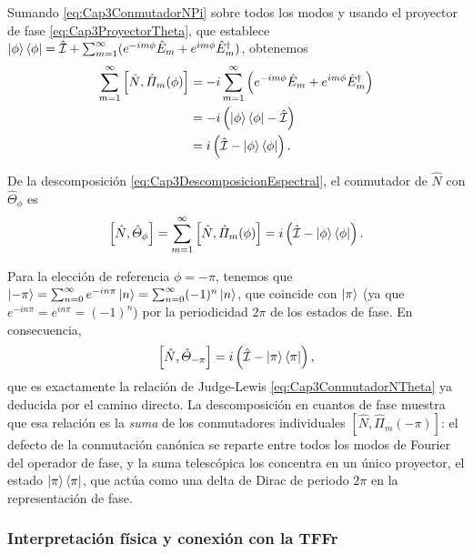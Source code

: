                 Sumando \ref{eq:Cap3ConmutadorNPi} sobre todos los modos y usando el proyector de fase \ref{eq:Cap3ProyectorTheta}, que establece $\ket{\phi}\bra{\phi} = \hat{\mathcal{I}} + \sum_{m=1}^{\infty}(e^{-im\phi}\hat{E}_m + e^{im\phi}\hat{E}_m^\dagger)$, obtenemos
                \begin{align}
                    \sum_{m=1}^{\infty}\left[\hat{N},\hat{\Pi}_m(\phi)\right] &= -i\sum_{m=1}^{\infty}\left(e^{-im\phi}\hat{E}_m + e^{im\phi}\hat{E}_m^\dagger\right)\nonumber\\
                    &= -i\left(\ket{\phi}\bra{\phi} - \hat{\mathcal{I}}\right)\nonumber\\
                    &= i\left(\hat{\mathcal{I}} - \ket{\phi}\bra{\phi}\right).
                    \label{eq:Cap3SumaConmutadoresPi}
                \end{align}

                De la descomposición \ref{eq:Cap3DescomposicionEspectral}, el conmutador de $\hat{N}$ con $\hat{\Theta}_\phi$ es
                \begin{equation}
                    \left[\hat{N}, \hat{\Theta}_\phi\right] = \sum_{m=1}^{\infty}\left[\hat{N}, \hat{\Pi}_m(\phi)\right] = i\left(\hat{\mathcal{I}} - \ket{\phi}\bra{\phi}\right).
                \end{equation}

                Para la elección de referencia $\phi = -\pi$, tenemos que $\ket{-\pi} = \sum_{n=0}^{\infty}e^{-in\pi}\ket{n} = \sum_{n=0}^{\infty}(-1)^n\ket{n}$, que coincide con $\ket{\pi}$ (ya que $e^{-in\pi} = e^{in\pi} = (-1)^n$) por la periodicidad $2\pi$ de los estados de fase. En consecuencia,
                \begin{equation}
                    \left[\hat{N}, \hat{\Theta}_{-\pi}\right] = i\left(\hat{\mathcal{I}} - \ket{\pi}\bra{\pi}\right),
                \end{equation}
                que es exactamente la relación de Judge-Lewis \ref{eq:Cap3ConmutadorNTheta} ya deducida por el camino directo. La descomposición en cuantos de fase muestra que esa relación es la \textit{suma} de los conmutadores individuales $[\hat{N}, \hat{\Pi}_m(-\pi)]$: el defecto de la conmutación canónica se reparte entre todos los modos de Fourier del operador de fase, y la suma telescópica los concentra en un único proyector, el estado $\ket{\pi}\bra{\pi}$, que actúa como una delta de Dirac de periodo $2\pi$ en la representación de fase.

            \subsubsection{Interpretación física y conexión con la TFFr}

